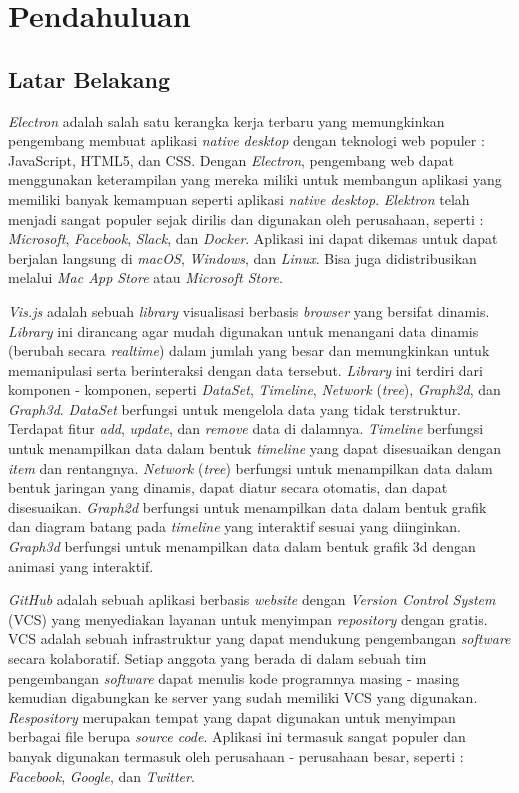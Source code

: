 \chapter{Pendahuluan}
\label{chap:intro}
   
\section{Latar Belakang}
\label{sec:label}

\textit{Electron} adalah salah satu kerangka kerja terbaru yang memungkinkan pengembang membuat aplikasi \textit{native desktop} dengan teknologi web populer : JavaScript, HTML5, dan CSS. Dengan \textit{Electron}, pengembang web dapat menggunakan keterampilan yang mereka miliki untuk membangun aplikasi yang memiliki banyak kemampuan seperti aplikasi \textit{native desktop}. \textit{Elektron} telah menjadi sangat populer sejak dirilis dan digunakan oleh perusahaan, seperti : \textit{Microsoft}, \textit{Facebook}, \textit{Slack}, dan \textit{Docker}. Aplikasi ini dapat dikemas untuk dapat berjalan langsung di \textit{macOS}, \textit{Windows}, dan \textit{Linux}. Bisa juga didistribusikan melalui \textit{Mac App Store} atau \textit{Microsoft Store}.

 \textit{Vis.js} adalah sebuah \textit{library} visualisasi berbasis \textit{browser} yang bersifat dinamis. \textit{Library} ini dirancang agar mudah digunakan untuk menangani data dinamis (berubah secara \textit{realtime}) dalam jumlah yang besar dan memungkinkan untuk memanipulasi serta berinteraksi dengan data tersebut. \textit{Library} ini terdiri dari komponen - komponen, seperti \textit{DataSet}, \textit{Timeline}, \textit{Network} (\textit{tree}), \textit{Graph2d}, dan \textit{Graph3d}. \textit{DataSet} berfungsi untuk mengelola data yang tidak terstruktur. Terdapat fitur \textit{add}, \textit{update}, dan \textit{remove} data di dalamnya. \textit{Timeline} berfungsi untuk menampilkan data dalam bentuk \textit{timeline} yang dapat disesuaikan dengan \textit{item} dan rentangnya.  \textit{Network} (\textit{tree}) berfungsi untuk menampilkan data dalam bentuk jaringan yang dinamis, dapat diatur secara otomatis, dan dapat disesuaikan. \textit{Graph2d} berfungsi untuk menampilkan data dalam bentuk grafik dan diagram batang pada \textit{timeline} yang interaktif sesuai yang diinginkan. \textit{Graph3d} berfungsi untuk menampilkan data dalam bentuk grafik 3d dengan animasi yang interaktif. 

\textit{GitHub} adalah sebuah aplikasi berbasis \textit{website} dengan \textit{Version Control System} (VCS) yang menyediakan layanan untuk menyimpan \textit{repository} dengan gratis. VCS  adalah sebuah infrastruktur yang dapat mendukung pengembangan \textit{software} secara kolaboratif. Setiap anggota yang berada di dalam sebuah tim pengembangan \textit{software} dapat menulis kode programnya masing - masing kemudian digabungkan ke server yang sudah memiliki VCS yang digunakan. \textit{Respository} merupakan tempat yang dapat digunakan untuk menyimpan berbagai file berupa \textit{source code}. Aplikasi ini termasuk sangat populer dan banyak digunakan termasuk oleh perusahaan - perusahaan besar, seperti : \textit{Facebook}, \textit{Google}, dan \textit{Twitter}.

